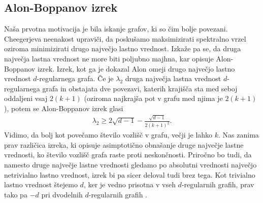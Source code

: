 \subsection{Alon-Boppanov izrek}
Naša prvotna motivacija je bila iskanje grafov, ki so čim bolje povezani. Cheegerjeva neenakost upraviči, da poskušamo maksimizirati spektralno vrzel oziroma minimizirati drugo največjo lastno vrednost. Izkaže pa se, da druga največja lastna vrednost ne more biti poljubno majhna, kar opisuje Alon-Boppanov izrek. Izrek, kot ga je dokazal Alon omeji drugo največjo lastno vrednost \(d\)-regularnega grafa. Če je \(\lambda_2\) druga največja lastna vrednost \(d\)-regularnega grafa in obstajata dve povezavi, katerih krajišča sta med seboj oddaljeni vsaj \(2(k+1)\) (oziroma najkrajša pot v grafu med njima je \(2(k+1)\)), potem se Alon-Boppanov \cite{alon-boppana-original} izrek glasi 
\begin{align*}
    \lambda_2 \geq 2\sqrt{d-1} - \frac{\sqrt{d-1}}{2(k+1)^2}.
\end{align*}
Vidimo, da bolj kot povečamo število vozlišč v grafu, večji je lahko \(k\). Nas zanima prav različica izreka, ki opisuje asimptotično obnašanje druge največje lastne vrednosti, ko število vozlišč grafa raste proti neskončnosti. Priročno bo tudi, da namesto druge največje lastne vrednosti gledamo po absolutni vrednosti največjo netrivialno lastno vrednost, izrek bi pa sicer deloval tudi brez tega. Kot trivialno lastno vrednost štejemo \(d\), ker je vedno prisotna v vseh \(d\)-regularnih grafih, prav tako pa \(-d\) pri dvodelnih \(d\)-regularnih grafih \cite{lps-ramanujan}.

